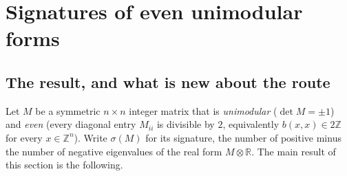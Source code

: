 
\section{Signatures of even unimodular forms}
\label{sec:signatures}

\subsection{The result, and what is new about the route}
\label{sec:sig-result}

Let $M$ be a symmetric $n\times n$ integer matrix that is
\emph{unimodular} ($\det M = \pm 1$) and \emph{even} (every diagonal
entry $M_{ii}$ is divisible by $2$, equivalently $b(x,x)\in 2\mathbb{Z}$
for every $x\in\mathbb{Z}^n$). Write $\sigma(M)$ for its signature, the
number of positive minus the number of negative eigenvalues of the real
form $M\otimes\mathbb{R}$. The main result of this section is the
following.

